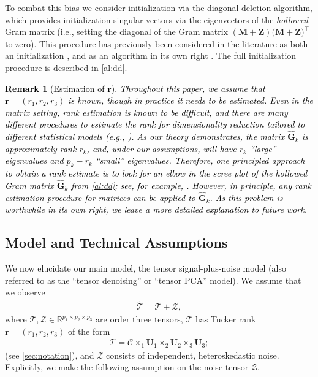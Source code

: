 \documentclass[10pt]{article}
\newcommand{\0}{{\mathbf{0}}}
\newcommand{\1}{{\mathbf{1}}}
\newcommand{\U}{{\mathbf{U}}}
\newcommand{\br}{\boldsymbol{r}}
\renewcommand{\citet}{\cite}
\renewcommand{\t}{^{\top}}
\newtheorem{remark}{Remark}
\begin{document}
To combat this bias we consider initialization via the diagonal deletion algorithm, which provides initialization singular vectors via the eigenvectors of the  \emph{hollowed} Gram matrix  (i.e., setting the diagonal of the Gram matrix $(\mathbf{M + Z})(\mathbf{M+Z)\t}$ to zero).  This procedure has previously been considered in the literature as both an initialization \citep{agterberg_estimating_2022,wang_implicit_2021}, and as an algorithm in its own right \citep{cai_subspace_2021}.  The full initialization procedure is described in \cref{al:dd}.  

\textcolor{black}{\begin{remark}[Estimation of $\br$] Throughout this paper, we assume that $\br = (r_1,r_2,r_3)$ is known, though in practice it needs to be estimated.  Even in the matrix setting, rank estimation is known to be difficult, and there are many different procedures to estimate the rank for dimensionality reduction tailored to different statistical models (e.g., \citet{jin_optimal_2023,han_universal_2023}).  As our theory demonstrates, the matrix $\mathbf{\widehat{G}}_k$ is approximately rank $r_k$, and, under our assumptions, will have $r_k$ ``large'' eigenvalues and $p_k - r_k$ ``small'' eigenvalues.  Therefore, one principled approach to obtain a rank estimate is to look for an elbow in the scree plot of the hollowed Gram matrix $\mathbf{\widehat{G}}_k$ from \cref{al:dd}; see, for example, \citet{zhu_automatic_2006}.  However, in principle, any rank estimation procedure for matrices can be applied to $\mathbf{\widehat{G}}_k$.  As this problem is worthwhile in its own right, we leave a more detailed explanation to future work. 
\end{remark}}


\subsection{Model and Technical Assumptions}
We now elucidate our main model, the tensor signal-plus-noise model (also referred to as the ``tensor denoising'' or ``tensor PCA'' model).  We assume that we observe
\begin{align*}
    \widetilde{\mathcal{T}} = \mathcal{T} + \mathcal{Z},
\end{align*}
where $\mathcal{T}, \mathcal{Z} \in \mathbb{R}^{p_1\times p_2\times p_3}$ are order three tensors, $\mathcal{T}$ has Tucker rank $\br = (r_1,r_2,r_3)$ of the form
\begin{align*}
    \mathcal{T} = \mathcal{C} \times_1 \U_1 \times_2 \U_2 \times_3 \U_3;
\end{align*}
(see \cref{sec:notation}), and $\mathcal{Z}$ consists of independent, heteroskedastic noise. Explicitly, we make the following assumption on the noise tensor $\mathcal{Z}$.
\end{document}
